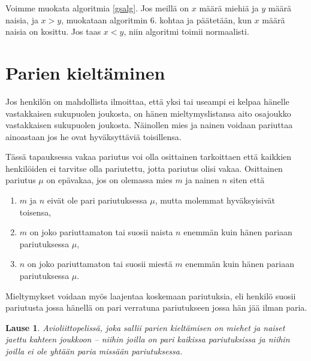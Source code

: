 \documentclass[finnish]{tktltiki2}
\newtheorem{lau}{Lause}
\theoremstyle{definition}
\theoremstyle{remark}
\begin{document}
Voimme muokata algoritmia \ref{gsalg}. Jos meillä on $x$ määrä miehiä ja $y$ määrä naisia, ja $x > y$, muokataan algoritmin 6. kohtaa ja päätetään, kun $x$ määrä naisia on kosittu. Jos taas $x < y$, niin algoritmi toimii normaalisti.


\section{Parien kieltäminen}
Jos henkilön on mahdollista ilmoittaa, että yksi tai useampi ei kelpaa hänelle vastakkaisen sukupuolen joukosta, on hänen mieltymyslistansa aito osajoukko vastakkaisen sukupuolen joukosta. Näinollen mies ja nainen voidaan pariuttaa ainoastaan jos he ovat hyväksyttäviä toisillensa.

Tässä tapauksessa vakaa pariutus voi olla osittainen tarkoittaen että kaikkien henkilöiden ei tarvitse olla pariutettu, jotta pariutus olisi vakaa. Osittainen pariutus $\mu$ on epävakaa, jos on olemassa mies $m$ ja nainen $n$ siten että
\begin{enumerate}
	\item $m$ ja $n$ eivät ole pari pariutuksessa $\mu$, mutta molemmat hyväksyisivät toisensa,
	\item $m$ on joko pariuttamaton tai suosii naista $n$ enemmän kuin hänen pariaan pariutuksessa $\mu$,
	\item $n$ on joko pariuttamaton tai suosii miestä $m$ enemmän kuin hänen pariaan pariutuksessa $\mu$.
\end{enumerate} 
Mieltymykset voidaan myös laajentaa koskemaan pariutuksia, eli henkilö suosii pariutusta jossa hänellä on pari verratuna pariutukseen jossa hän jää ilman paria.

\begin{lau}
Avioliittopelissä, joka sallii parien kieltämisen on miehet ja naiset jaettu kahteen joukkoon -- niihin joilla on pari kaikissa pariutuksissa ja niihin joilla ei ole yhtään paria missään pariutuksessa.
\end{lau}
\end{document}
